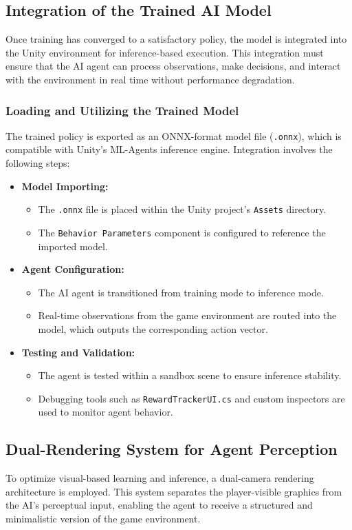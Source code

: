 \documentclass[12pt,oneside,openright,a4paper]{cpe-english-project}
\begin{document}
\subsection{Integration of the Trained AI Model}
Once training has converged to a satisfactory policy, the model is integrated into the Unity environment for inference-based execution. This integration must ensure that the AI agent can process observations, make decisions, and interact with the environment in real time without performance degradation.
\subsubsection{Loading and Utilizing the Trained Model}
The trained policy is exported as an ONNX-format model file (\texttt{.onnx}), which is compatible with Unity’s ML-Agents inference engine. Integration involves the following steps:\par
\begin{itemize}
\item \textbf{Model Importing:}
\begin{itemize}
\item The \texttt{.onnx} file is placed within the Unity project’s \texttt{Assets} directory.
\item The \texttt{Behavior Parameters} component is configured to reference the imported model.
\end{itemize}
\item \textbf{Agent Configuration:}
\begin{itemize}
\item The AI agent is transitioned from training mode to inference mode.
\item Real-time observations from the game environment are routed into the model, which outputs the corresponding action vector.
\end{itemize}
\item \textbf{Testing and Validation:}
\begin{itemize}
\item The agent is tested within a sandbox scene to ensure inference stability.
\item Debugging tools such as \texttt{RewardTrackerUI.cs} and custom inspectors are used to monitor agent behavior.
\end{itemize}
\end{itemize}
\subsection{Dual-Rendering System for Agent Perception}
To optimize visual-based learning and inference, a dual-camera rendering architecture is employed. This system separates the player-visible graphics from the AI’s perceptual input, enabling the agent to receive a structured and minimalistic version of the game environment.
\end{document}
